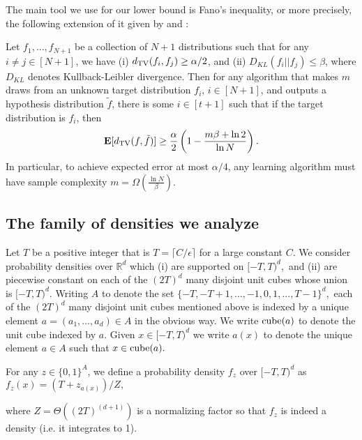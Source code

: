 The main tool we use for our lower bound is Fano's inequality, or more precisely, the following extension of it
given by 
\citep{IK79} and \citep{AB83}:

\begin{theorem} \label{fano}
Let $f_1,\dots,f_{N+1}$ be a collection of $N+1$ distributions such that for any $i \neq j \in [N+1]$, we
have (i) $d_\mathrm{TV}(f_i,f_j) \geq \alpha/2$, and (ii) $D_{KL}(f_i || f_j) \leq \beta$, where $D_{KL}$ denotes Kullback-Leibler divergence.  Then for any algorithm that makes $m$ draws from an unknown target distribution $f_i$, $i \in [N+1]$, and outputs a hypothesis distribution $\tilde{f}$, there is some $i \in [t+1]$ such that if the target distribution is $f_i$, then 
\[
\operatorname{{\bf E}}[d_\mathrm{TV}(f,\tilde{f})] \geq {\frac \alpha 2} \left(1 - {\frac {m \beta + \ln 2}{\ln N}}\right).
\]
In particular, to achieve expected error at most $\alpha/4$, any learning algorithm must have sample complexity
$m=\Omega \left(\frac{\ln N}{\beta}\right).$
\end{theorem}

\subsection{The family of densities we analyze} \label{sec:family}

Let $T$ be a positive integer that is $T=\lceil C/\epsilon\rceil$ for a large constant $C$.
We consider probability densities over $\mathbb{R}^d$ which  (i) are supported on $[-T,T)^d,$ and (ii) are piecewise constant on each of the $(2T)^d$ many disjoint unit cubes whose union is $[-T,T)^d.$  Writing $A$ to denote the set $\{-T,-T+1,\dots,-1,0,1,\dots,T-1\}^d,$ each of the $(2T)^d$ many disjoint unit cubes mentioned above is indexed by a unique element $a=(a_1,\dots,a_d) \in A$ in the obvious way.  We write ${\mathrm{cube}}(a)$ to denote the unit cube indexed by $a$.  Given $x \in [-T,T)^d$ we write $a(x)$ to denote the unique element $a \in A$ such that $x \in {\mathrm{cube}}(a).$

For any $z \in \{0,1\}^{A}$, we define a probability density $f_z$ over $[-T,T)^d$ as $f_z(x) = (T+z_{a(x)})/Z,$
\ignore{\[f_z(x) = \begin{cases}
(T+1)/Z 		& \text{~if~}z_{a(x)}=1,\\
T/Z	& \text{~if~}z_{a(x)}=0,
\end{cases}
\]
}where $Z=\Theta((2T)^{(d+1)})$ is a normalizing factor so that $f_z$ is indeed a density (i.e. it integrates to 1).

